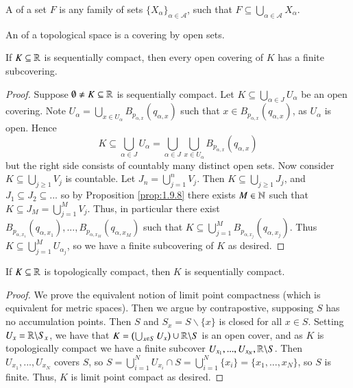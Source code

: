 \begin{definition}
    A  of a set $F$ is any family of sets $\{X_{\alpha}\}_{\alpha \in \mathcal{A}}$, such that $F \subseteq \bigcup_{\alpha \in \mathcal{A}} X_{\alpha}$.
\end{definition}

\begin{definition}
    An  of a topological space is a covering by open sets.
\end{definition}

\begin{proposition}\label{prop:1.9.11}
    If $K \subseteq \mathbb R$ is sequentially compact, then every open covering of $K$ has a finite subcovering.
\end{proposition}
\begin{proof}
    Suppose $\emptyset\neq K \subseteq \mathbb R$ is sequentially compact. Let $K \subseteq \bigcup_{\alpha \in J}U_{\alpha}$ be an open covering. Note $U_{\alpha} = \bigcup_{x \in U_{\alpha}}B_{p_{\alpha,x}}(q_{\alpha,x})$ such that $x \in B_{p_{\alpha,x}}(q_{\alpha,x})$, as $U_{\alpha}$ is open. Hence $$K \subseteq \bigcup_{\alpha \in J}U_{\alpha} = \bigcup_{\alpha \in J}\bigcup_{x \in U_{\alpha}}B_{p_{\alpha,x}}(q_{\alpha,x})$$ but the right side consists of countably many distinct open sets. Now consider $K \subseteq \bigcup_{j\geq 1}V_j$ is countable. Let $J_n = \bigcup_{j=1}^nV_j$. Then $K \subseteq \bigcup_{j\geq 1}J_j$, and $J_1 \subseteq J_2 \subseteq ...$ so by Proposition \ref{prop:1.9.8} there exists $M \in \mathbb N$ such that $K \subseteq J_M = \bigcup_{j=1}^MV_j$. Thus, in particular there exist $B_{p_{\alpha,x_1}}(q_{\alpha,x_1}),...,B_{p_{\alpha,x_M}}(q_{\alpha,x_M})$ such that $K \subseteq \bigcup_{j=1}^MB_{p_{\alpha,x_j}}(q_{\alpha,x_j})$. Thus $K \subseteq \bigcup_{j=1}^MU_{\alpha_j}$, so we have a finite subcovering of $K$ as desired.
\end{proof}

\begin{proposition}
    If $K \subseteq \mathbb R$ is topologically compact, then $K$ is sequentially compact.
\end{proposition}
\begin{proof}
    We prove the equivalent notion of limit point compactness (which is equivalent for metric spaces). Then we argue by contrapostive, supposing $S$ has no accumulation points. Then $S$ and $S_x = S\backslash\{x\}$ is closed for all $x \in S$. Setting $U_x = \mathbb R\backslash S_x$, we have that $K = \left(\bigcup_{x \in S}U_x\right)\cup \mathbb R\backslash S$ is an open cover, and as $K$ is topologically compact we have a finite subcover $U_{x_1},...,U_{x_N},\mathbb R\backslash S$. Then $U_{x_1},...,U_{x_N}$ covers $S$, so $S = \bigcup_{i=1}^NU_{x_i}\cap S = \bigcup_{i=1}^N\{x_i\} = \{x_1,...,x_N\}$, so $S$ is finite. Thus, $K$ is limit point compact as desired.
\end{proof}

